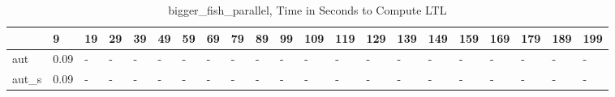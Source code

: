 \begin{table}
\caption{bigger_fish_parallel, Time in Seconds to Compute LTL}
\label{bigger_fish_parallel_LTL_time}
\begin{tabular}{lllllllllllllllllllll}
\toprule
 & 9 & 19 & 29 & 39 & 49 & 59 & 69 & 79 & 89 & 99 & 109 & 119 & 129 & 139 & 149 & 159 & 169 & 179 & 189 & 199 \\
\midrule
aut & 0.09 & - & - & - & - & - & - & - & - & - & - & - & - & - & - & - & - & - & - & - \\
aut_s & 0.09 & - & - & - & - & - & - & - & - & - & - & - & - & - & - & - & - & - & - & - \\
\bottomrule
\end{tabular}
\end{table}
